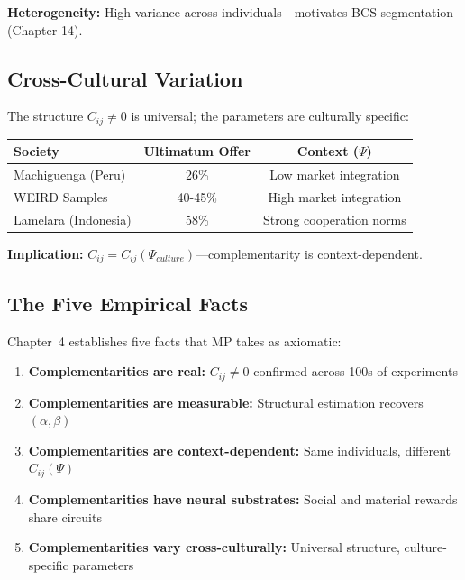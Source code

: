 \textbf{Heterogeneity:} High variance across individuals---motivates BCS segmentation (Chapter 14).

\subsection{Cross-Cultural Variation}

The structure $C_{ij} \neq 0$ is universal; the parameters are culturally specific:

\begin{center}
\renewcommand{\arraystretch}{1.2}
\begin{tabular}{lcc}
\toprule
\textbf{Society} & \textbf{Ultimatum Offer} & \textbf{Context ($\Psi$)} \\
\midrule
Machiguenga (Peru) & 26\% & Low market integration \\
WEIRD Samples & 40-45\% & High market integration \\
Lamelara (Indonesia) & 58\% & Strong cooperation norms \\
\bottomrule
\end{tabular}
\end{center}

\textbf{Implication:} $C_{ij} = C_{ij}(\Psi_{culture})$---complementarity is context-dependent.

\subsection{The Five Empirical Facts}

Chapter~4 establishes five facts that MP takes as axiomatic:

\begin{tcolorbox}[colback=green!5!white, colframe=green!75!black,
    title=\textbf{Five Empirical Facts (Chapter 4)}]

\begin{enumerate}
\item \textbf{Complementarities are real:} $C_{ij} \neq 0$ confirmed across 100s of experiments
\item \textbf{Complementarities are measurable:} Structural estimation recovers $(\alpha, \beta)$
\item \textbf{Complementarities are context-dependent:} Same individuals, different $C_{ij}(\Psi)$
\item \textbf{Complementarities have neural substrates:} Social and material rewards share circuits
\item \textbf{Complementarities vary cross-culturally:} Universal structure, culture-specific parameters
\end{enumerate}

\end{tcolorbox}

